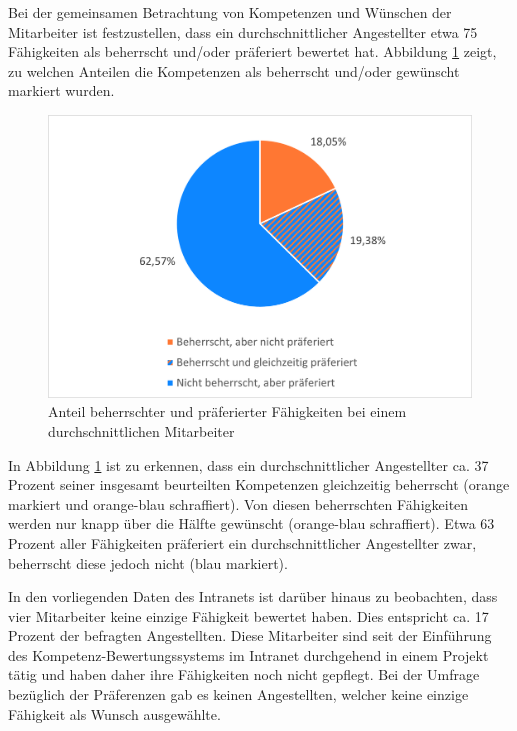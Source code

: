 Bei der gemeinsamen Betrachtung von Kompetenzen und Wünschen der Mitarbeiter ist festzustellen, dass ein durchschnittlicher Angestellter etwa 75 Fähigkeiten als beherrscht und/oder präferiert bewertet hat. Abbildung \ref{fig:ergebnisse:analyse:abb3} zeigt, zu welchen Anteilen die Kompetenzen als beherrscht und/oder gewünscht markiert wurden.

\begin{figure}[h]
	\centering
	\includegraphics[width=1\textwidth]{gfx/auswertung-anteil-an-faehigkeiten.png}
	\caption{Anteil beherrschter und präferierter Fähigkeiten bei einem durchschnittlichen Mitarbeiter}
	\label{fig:ergebnisse:analyse:abb3}
\end{figure}

In Abbildung \ref{fig:ergebnisse:analyse:abb3} ist zu erkennen, dass ein durchschnittlicher Angestellter ca. 37 Prozent seiner insgesamt beurteilten Kompetenzen gleichzeitig beherrscht (orange markiert und orange-blau schraffiert). Von diesen beherrschten Fähigkeiten werden nur knapp über die Hälfte gewünscht (orange-blau schraffiert). Etwa 63 Prozent aller Fähigkeiten präferiert ein durchschnittlicher Angestellter zwar, beherrscht diese jedoch nicht (blau markiert).

In den vorliegenden Daten des Intranets ist darüber hinaus zu beobachten, dass vier Mitarbeiter keine einzige Fähigkeit bewertet haben. Dies entspricht ca. 17 Prozent der befragten Angestellten. Diese Mitarbeiter sind seit der Einführung des Kompetenz-Bewertungssystems im Intranet durchgehend in einem Projekt tätig und haben daher ihre Fähigkeiten noch nicht gepflegt. Bei der Umfrage bezüglich der Präferenzen gab es keinen Angestellten, welcher keine einzige Fähigkeit als Wunsch ausgewählte.
\newpage
